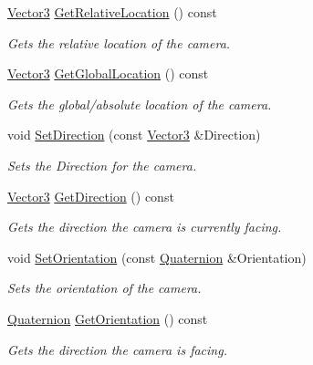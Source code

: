 \begin{DoxyCompactItemize}
\item 
\hyperlink{classphys_1_1Vector3}{Vector3} \hyperlink{classphys_1_1Camera_ae3dc70090e83e19a9c5f6df302bb57a5}{GetRelativeLocation} () const 
\begin{DoxyCompactList}\small\item\em Gets the relative location of the camera. \item\end{DoxyCompactList}\item 
\hyperlink{classphys_1_1Vector3}{Vector3} \hyperlink{classphys_1_1Camera_a7f71146cd533f6a1fc8426a9ed40b763}{GetGlobalLocation} () const 
\begin{DoxyCompactList}\small\item\em Gets the global/absolute location of the camera. \item\end{DoxyCompactList}\item 
void \hyperlink{classphys_1_1Camera_a6ece06a179798b3240362b1bcb751f2f}{SetDirection} (const \hyperlink{classphys_1_1Vector3}{Vector3} \&Direction)
\begin{DoxyCompactList}\small\item\em Sets the Direction for the camera. \item\end{DoxyCompactList}\item 
\hyperlink{classphys_1_1Vector3}{Vector3} \hyperlink{classphys_1_1Camera_a6f0294569edb3e65de4139da361f83a9}{GetDirection} () const 
\begin{DoxyCompactList}\small\item\em Gets the direction the camera is currently facing. \item\end{DoxyCompactList}\item 
void \hyperlink{classphys_1_1Camera_adbfa4a59eb09c0578c9aac792b78ef55}{SetOrientation} (const \hyperlink{classphys_1_1Quaternion}{Quaternion} \&Orientation)
\begin{DoxyCompactList}\small\item\em Sets the orientation of the camera. \item\end{DoxyCompactList}\item 
\hyperlink{classphys_1_1Quaternion}{Quaternion} \hyperlink{classphys_1_1Camera_a48e0b33e0f12247bc0a0e0d6f759683e}{GetOrientation} () const 
\begin{DoxyCompactList}\small\item\em Gets the direction the camera is facing. \item\end{DoxyCompactList}\item 

\end{DoxyCompactItemize}
